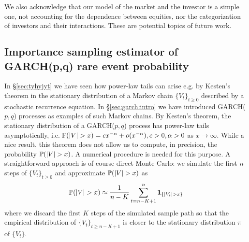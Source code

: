 We also acknowledge that our model of the market and the investor is a
simple one, not accounting for the dependence between equities, nor
the categorization of investors and their interactions. These are
potential topics of future work.

\subsection{Importance sampling estimator of GARCH(p,q) rare event
  probability}
In \S\ref{sec:tyhyjyt} we have seen how power-law tails can
arise e.g. by Kesten's theorem in the stationary distribution of a
Markov chain $\{V_t\}_{t \geq 0}$ described by a stochastic recurrence
equation. In \S\ref{sec:garch:intro} we have introduced GARCH($p,q$)
processes as examples of such Markov chains. By Kesten's theorem, the
stationary distribution of a GARCH($p,q$) process has power-law tails
asymptotically, i.e.
$\P(|V| > x) = c x^{-\alpha} + o(x^{-\alpha}), c > 0, \alpha > 0$ as
$x \to \infty$. While a nice result, this theorem does not allow us to
compute, in precision, the probability $\P(|V| > x)$. A numerical
procedure is needed for this purpose. A straightforward approach is of
course direct Monte Carlo: we simulate the first $n$ steps of
$\{V_t\}_{t \geq 0}$ and approximate $\P(|V| > x)$ as
\begin{equation}
  \label{eq:trhythyth}
  \P(|V| > x) \approx {1 \over n - K} \sum_{t={n-K+1}}^n\1{|V_t| > x}
\end{equation}
where we discard the first $K$ steps of the simulated sample path so
that the empirical distribution of $\{V_t\}_{t \geq n-K+1}$ is closer
to the stationary distribution $\pi$ of $\{V_t\}$.


